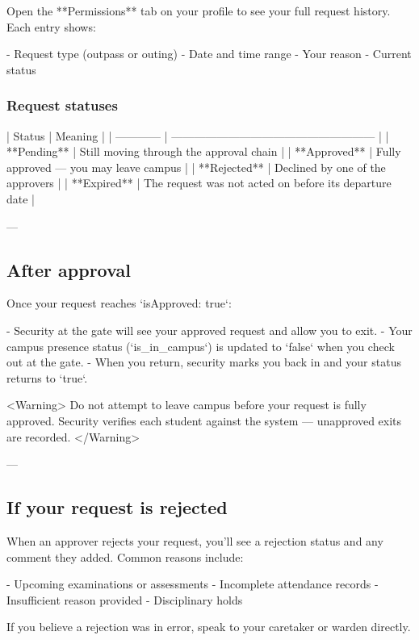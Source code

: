 Open the **Permissions** tab on your profile to see your full request history. Each entry shows:

- Request type (outpass or outing)
- Date and time range
- Your reason
- Current status

\subsubsection{Request statuses}

| Status       | Meaning                                                |
| ------------ | ------------------------------------------------------ |
| **Pending**  | Still moving through the approval chain                |
| **Approved** | Fully approved — you may leave campus                  |
| **Rejected** | Declined by one of the approvers                       |
| **Expired**  | The request was not acted on before its departure date |

---

\subsection{After approval}

Once your request reaches `isApproved: true`:

- Security at the gate will see your approved request and allow you to exit.
- Your campus presence status (`is_in_campus`) is updated to `false` when you check out at the gate.
- When you return, security marks you back in and your status returns to `true`.

<Warning>
  Do not attempt to leave campus before your request is fully approved. Security
  verifies each student against the system — unapproved exits are recorded.
</Warning>

---

\subsection{If your request is rejected}

When an approver rejects your request, you'll see a rejection status and any comment they added. Common reasons include:

- Upcoming examinations or assessments
- Incomplete attendance records
- Insufficient reason provided
- Disciplinary holds

If you believe a rejection was in error, speak to your caretaker or warden directly.

